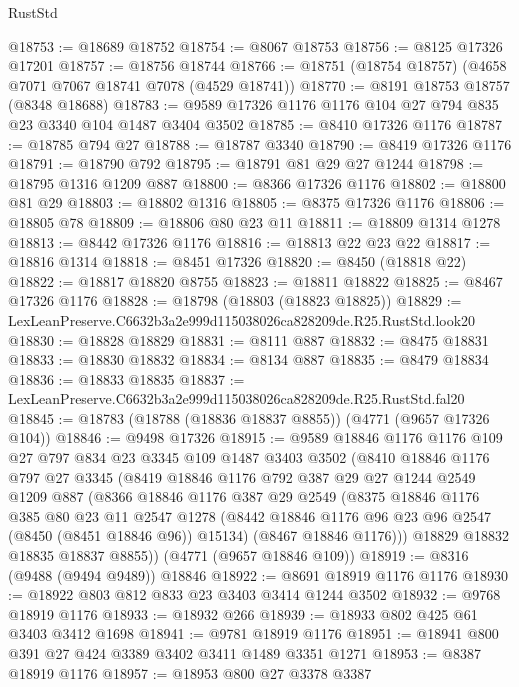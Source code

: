 \begin{lexlean}{RustStd}
\begin{coremodule}
@18753 := @18689 @18752
@18754 := @8067 @18753
@18756 := @8125 @17326 @17201
@18757 := @18756 @18744
@18766 := @18751 (@18754 @18757) (@4658 @7071 @7067 @18741 @7078 (@4529 @18741))
@18770 := @8191 @18753 @18757 (@8348 @18688)
@18783 := @9589 @17326 @1176 @1176 @104 @27 @794 @835 @23 @3340 @104 @1487 @3404 @3502
@18785 := @8410 @17326 @1176
@18787 := @18785 @794 @27
@18788 := @18787 @3340
@18790 := @8419 @17326 @1176
@18791 := @18790 @792
@18795 := @18791 @81 @29 @27 @1244
@18798 := @18795 @1316 @1209 @887
@18800 := @8366 @17326 @1176
@18802 := @18800 @81 @29
@18803 := @18802 @1316
@18805 := @8375 @17326 @1176
@18806 := @18805 @78
@18809 := @18806 @80 @23 @11
@18811 := @18809 @1314 @1278
@18813 := @8442 @17326 @1176
@18816 := @18813 @22 @23 @22
@18817 := @18816 @1314
@18818 := @8451 @17326
@18820 := @8450 (@18818 @22)
@18822 := @18817 @18820 @8755
@18823 := @18811 @18822
@18825 := @8467 @17326 @1176
@18828 := @18798 (@18803 (@18823 @18825))
@18829 := LexLeanPreserve.C6632b3a2e999d115038026ca828209de.R25.RustStd.look20
@18830 := @18828 @18829
@18831 := @8111 @887
@18832 := @8475 @18831
@18833 := @18830 @18832
@18834 := @8134 @887
@18835 := @8479 @18834
@18836 := @18833 @18835
@18837 := LexLeanPreserve.C6632b3a2e999d115038026ca828209de.R25.RustStd.fal20
@18845 := @18783 (@18788 (@18836 @18837 @8855)) (@4771 (@9657 @17326 @104))
@18846 := @9498 @17326
@18915 := @9589
    @18846
    @1176
    @1176
    @109
    @27
    @797
    @834
    @23
    @3345
    @109
    @1487
    @3403
    @3502
    (@8410
      @18846
      @1176
      @797
      @27
      @3345
      (@8419
        @18846
        @1176
        @792
        @387
        @29
        @27
        @1244
        @2549
        @1209
        @887
        (@8366
          @18846
          @1176
          @387
          @29
          @2549
          (@8375
            @18846
            @1176
            @385
            @80
            @23
            @11
            @2547
            @1278
            (@8442 @18846 @1176 @96 @23 @96 @2547 (@8450 (@8451 @18846 @96)) @15134)
            (@8467 @18846 @1176)))
        @18829
        @18832
        @18835
        @18837
        @8855))
    (@4771 (@9657 @18846 @109))
@18919 := @8316 (@9488 (@9494 @9489)) @18846
@18922 := @8691 @18919 @1176 @1176
@18930 := @18922 @803 @812 @833 @23 @3403 @3414 @1244 @3502
@18932 := @9768 @18919 @1176
@18933 := @18932 @266
@18939 := @18933 @802 @425 @61 @3403 @3412 @1698
@18941 := @9781 @18919 @1176
@18951 := @18941 @800 @391 @27 @424 @3389 @3402 @3411 @1489 @3351 @1271
@18953 := @8387 @18919 @1176
@18957 := @18953 @800 @27 @3378 @3387

\end{coremodule}
\end{lexlean}
